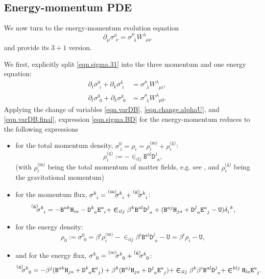 \documentclass[
10pt, %
a4paper, %
oneside, %
headinclude,footinclude, %
BCOR5mm, %
]{scrartcl}
\newcommand{\pd}[1]{\partial_{#1}}
\newcommand{\Dfin}[2]{\mathtt{D}_{\phantom{#2}#1}^{#2}}	%
\newcommand{\Hfin}[2]{\mathtt{H}_{#2#1}}	%
\newcommand{\Efin}[2]{\mathtt{E}^{#1}_{\phantom{#1}#2}}	%
\newcommand{\Ufin}{\mathtt{U}}
\newcommand{\Bfin}[2]{\mathtt{B}^{#1#2}}	%
\newcommand{\w}[2]{W^{#1}_{\phantom{#1}#2}}
\newcommand{\EMmat}[2]{\sigma^{#1}_{\ \,#2}}
\newcommand{\LCsymb}{\bm{\in}}    %
\newcommand{\mat}[1]{\prescript{\text{(m)}}{}{\hspace{-0.1cm}#1}}
\newcommand{\gra}[1]{\prescript{\text{(g)}}{}{\hspace{-0.1cm}#1}}
\newcommand{\KD}[2]{\delta^{\ #1}_{#2}}
\newcommand{\shift}[1]{\beta^{#1}}
\begin{document}
\subsection{Energy-momentum PDE}\label{sec.energymomentum}

We now turn to the energy-momentum evolution equation
\begin{equation}\label{eqn.sigma.31}
	\pd{\mu}\EMmat{\mu}{\nu} 
	 = \EMmat{\mu}{\lambda} 
	\w{\lambda}{\mu\nu}
\end{equation}
and provide its $ 3+1 $ version.

We first, explicitly split \eqref{eqn.sigma.31} into the three momentum and one energy equation:
\begin{subequations}\label{eqn.EM.sigma}
	\begin{align}
		\pd{t}\EMmat{0}{i} + \pd{k}\EMmat{k}{i}
		& = \EMmat{\mu}{\lambda} 
		\w{\lambda}{\mu i},\\[2mm]
		\pd{t}\EMmat{0}{0} + \pd{k}\EMmat{k}{0}
		& = \EMmat{\mu}{\lambda} 
		\w{\lambda}{\mu 0}.
	\end{align}
\end{subequations}
Applying the change of variables \eqref{eqn.varDB}, \eqref{eqn.change.alphaU}, and 
\eqref{eqn.varDB.final}, expression \eqref{eqn.sigma.BD} for the energy-momentum reduces to the 
following expressions
\begin{itemize}
	\item 
	for the total momentum density, $ \sigma^0_{\ i} = \rho_i = \rho^\text{(m)}_i + 
	\rho^\text{(g)}_i $:
	\begin{equation}\label{eqn.sigma0i}
		\rho^\text{(g)}_i :=-\LCsymb_{ilj} \Bfin{a}{l}\Dfin{a}{j},
	\end{equation}
	(with $ \rho^\text{(m)}_i $ being the total momentum of matter fields, e.g. see 
	\cite{PTRSA2020}, and $ \rho^\text{(g)}_i 
	$ 
	being the gravitational momentum)
	\item
	for the momentum flux, $ \EMmat{k}{i} = \mat{\EMmat{k}{i}} + \gra{\EMmat{k}{i}}$:
	\begin{equation}\label{eqn.sigmaki}
		\gra{\EMmat{k}{i}} = -\Bfin{a}{k} \Hfin{a}{i} - \Dfin{a}{k} \Efin{a}{i} + 
		\LCsymb_{ilj} 
		\beta^k \Bfin{a}{l}\Dfin{a}{j} + (\Bfin{a}{j} \Hfin{a}{j} + \Dfin{a}{j} \Efin{a}{j} 
		- \Ufin)\KD{k}{i},
	\end{equation}
	\item
	for the energy density:
	\begin{equation}\label{eqn.sigma00}
		\rho_0 :=\EMmat{0}{0} = \shift{i} \rho^\text{(m)}_i - \LCsymb_{ilj} 
		\beta^i\Bfin{a}{l}\Dfin{a}{j} - \Ufin = \beta^i 
		\rho_i 
		- \Ufin,
	\end{equation}
	\item
	and for the energy flux, $ \EMmat{k}{0} = \mat{\EMmat{k}{0}}+\gra{\EMmat{k}{0}}$:
	\begin{equation}\label{eqn.sigmak0}
		\gra{\EMmat{k}{0}} = -\beta^j( \Bfin{a}{k} \Hfin{a}{j} + \Dfin{a}{k} \Efin{a}{j})
		+
		\beta^k( \Bfin{a}{j} \Hfin{a}{j} + \Dfin{a}{j} \Efin{a}{j})
		+
		\LCsymb_{ilj}\beta^k\beta^i\Bfin{a}{l}\Dfin{a}{j}
		+
		\LCsymb^{klj} \Hfin{a}{l} \Efin{a}{j}.
	\end{equation}
\end{itemize}
\end{document}
